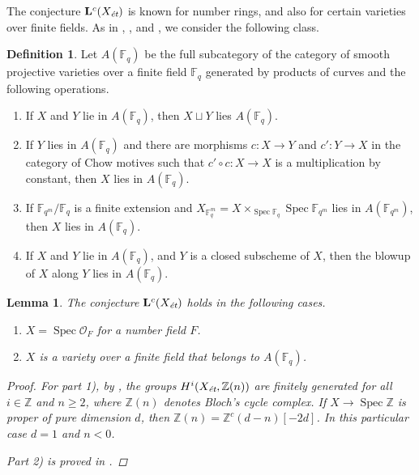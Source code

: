 \documentclass[draft,leqno,12pt]{article}
\theoremstyle{plain}
\newtheorem{lemma}[theorem]{\indent\sc Lemma}
\theoremstyle{definition}
\newtheorem{definition}[theorem]{\indent\sc Definition}
\DeclareMathOperator{\Spec}{Spec}
\newcommand{\ZZ}{\mathbb{Z}}
\newcommand{\FF}{\mathbb{F}}
\newcommand{\et}{\text{\it \'{e}t}}
\begin{document}
The conjecture $\mathbf{L}^c (X_\et)$ is known for number rings, and also for
certain varieties over finite fields. As in \cite{Soule-1984},
\cite{Geisser-2004}, and \cite{Morin-2014}, we consider the following class.

\begin{definition}
  Let $A (\FF_q)$ be the full subcategory of the category of smooth projective
  varieties over a finite field $\FF_q$ generated by products of curves and the
  following operations.
  \begin{enumerate}
  \item[1)] If $X$ and $Y$ lie in $A (\FF_q)$, then $X \sqcup Y$ lies
    $A (\FF_q)$.
  \item[2)] If $Y$ lies in $A (\FF_q)$ and there are morphisms $c\colon X\to Y$
    and $c'\colon Y\to X$ in the category of Chow motives such that
    $c'\circ c\colon X\to X$ is a multiplication by constant, then
    $X$ lies in $A (\FF_q)$.
  \item[3)] If $\FF_{q^m}/\FF_q$ is a finite extension and
    $X_{\FF_q^m} = X \times_{\Spec \FF_q} \Spec \FF_{q^m}$ lies in
    $A (\FF_{q^m})$, then $X$ lies in $A (\FF_q)$.
  \item[4)] If $X$ and $Y$ lie in $A (\FF_q)$, and $Y$ is a closed subscheme of
    $X$, then the blowup of $X$ along $Y$ lies in $A (\FF_q)$.
  \end{enumerate}
\end{definition}

\begin{lemma}
  \label{lemma:Lc(Xet)-holds-for-OF-and-A(Fq)}
  The conjecture $\mathbf{L}^c (X_\et)$ holds in the following cases.

  \begin{enumerate}
  \item[$1)$] $X = \Spec \mathcal{O}_F$ for a number field $F$.

  \item[$2)$] $X$ is a variety over a finite field that belongs to $A (\FF_q)$.
  \end{enumerate}

  \begin{proof}
    For part 1), by \cite[Theorem~5.1~(b)]{Morin-2014}, the groups
    $H^i (X_\et, \ZZ(n))$ are finitely generated for all $i \in \ZZ$ and
    $n \ge 2$, where $\ZZ (n)$ denotes Bloch's cycle complex. If
    $X \to \Spec \ZZ$ is proper of pure dimension $d$, then
    $\ZZ (n) = \ZZ^c (d-n) [-2d]$. In this particular case $d = 1$ and $n < 0$.

    Part 2) is proved in \cite[Proposition~5.7]{Morin-2014}.
  \end{proof}
\end{lemma}
\end{document}
